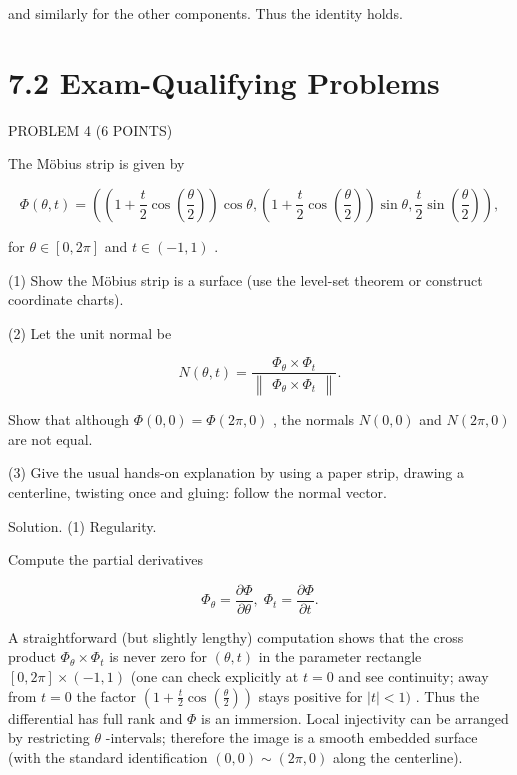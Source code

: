 \documentclass[10pt]{article}
\begin{document}
and similarly for the other components. Thus the identity holds.

\section*{7.2 Exam-Qualifying Problems}

PROBLEM 4 (6 POINTS)

The Möbius strip is given by

\[
\Phi \left( {\theta ,t}\right)  = \left( {\left( {1 + \frac{t}{2}\cos \left( \frac{\theta }{2}\right) }\right) \cos \theta ,\left( {1 + \frac{t}{2}\cos \left( \frac{\theta }{2}\right) }\right) \sin \theta ,\frac{t}{2}\sin \left( \frac{\theta }{2}\right) }\right) ,
\]

for \(\theta  \in  \left\lbrack  {0,{2\pi }}\right\rbrack\) and \(t \in  \left( {-1,1}\right)\) .

(1) Show the Möbius strip is a surface (use the level-set theorem or construct coordinate charts).

(2) Let the unit normal be

\[
N\left( {\theta ,t}\right)  = \frac{{\Phi }_{\theta } \times  {\Phi }_{t}}{\begin{Vmatrix}{\Phi }_{\theta } \times  {\Phi }_{t}\end{Vmatrix}}.
\]

Show that although \(\Phi \left( {0,0}\right)  = \Phi \left( {{2\pi },0}\right)\) , the normals \(N\left( {0,0}\right)\) and \(N\left( {{2\pi },0}\right)\) are not equal.

(3) Give the usual hands-on explanation by using a paper strip, drawing a centerline, twisting once and gluing: follow the normal vector.

Solution. (1) Regularity.

Compute the partial derivatives

\[
{\Phi }_{\theta } = \frac{\partial \Phi }{\partial \theta },\;{\Phi }_{t} = \frac{\partial \Phi }{\partial t}.
\]

A straightforward (but slightly lengthy) computation shows that the cross product \({\Phi }_{\theta } \times  {\Phi }_{t}\) is never zero for \(\left( {\theta ,t}\right)\) in the parameter rectangle \(\left\lbrack  {0,{2\pi }}\right\rbrack   \times  \left( {-1,1}\right)\) (one can check explicitly at \(t = 0\) and see continuity; away from \(t = 0\) the factor \(\left( {1 + \frac{t}{2}\cos \left( \frac{\theta }{2}\right) }\right)\) stays positive for \(\left| t\right|  < 1)\) . Thus the differential has full rank and \(\Phi\) is an immersion. Local injectivity can be arranged by restricting \(\theta\) -intervals; therefore the image is a smooth embedded surface (with the standard identification \(\left( {0,0}\right)  \sim  \left( {{2\pi },0}\right)\) along the centerline).
\end{document}
